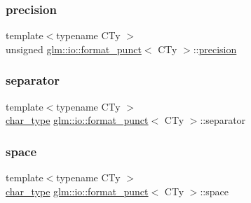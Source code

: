 \mbox{\label{classglm_1_1io_1_1format__punct_a5a15d396b7c963df9dec5e124236dc02}} 
\subsubsection{\texorpdfstring{precision}{precision}}
{\footnotesize\ttfamily template$<$typename C\+Ty $>$ \\
unsigned \mbox{\hyperlink{classglm_1_1io_1_1format__punct}{glm\+::io\+::format\+\_\+punct}}$<$ C\+Ty $>$\+::\mbox{\hyperlink{structglm_1_1io_1_1precision}{precision}}}

\mbox{\label{classglm_1_1io_1_1format__punct_ac561eb04fc2a1282ef38ea15f8e640ee}} 
\subsubsection{\texorpdfstring{separator}{separator}}
{\footnotesize\ttfamily template$<$typename C\+Ty $>$ \\
\mbox{\hyperlink{classglm_1_1io_1_1format__punct_ae94c42484a4c5258ad7b2f0f029efdf3}{char\+\_\+type}} \mbox{\hyperlink{classglm_1_1io_1_1format__punct}{glm\+::io\+::format\+\_\+punct}}$<$ C\+Ty $>$\+::separator}

\mbox{\label{classglm_1_1io_1_1format__punct_adf9a915938727793de1daca07dcdfa4e}} 
\subsubsection{\texorpdfstring{space}{space}}
{\footnotesize\ttfamily template$<$typename C\+Ty $>$ \\
\mbox{\hyperlink{classglm_1_1io_1_1format__punct_ae94c42484a4c5258ad7b2f0f029efdf3}{char\+\_\+type}} \mbox{\hyperlink{classglm_1_1io_1_1format__punct}{glm\+::io\+::format\+\_\+punct}}$<$ C\+Ty $>$\+::space}

